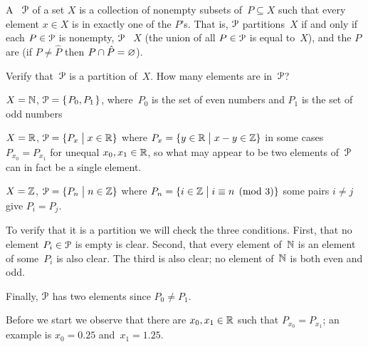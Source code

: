 \documentclass{ibl}  %
\begin{document}
\begin{df}
A ~$\EuScript{P}$ of a set $X$ is a 
collection of nonempty subsets of~$P\subseteq X$ such that every 
element $x\in X$ is in exactly one of the $P$'s.
That is, $\EuScript{P}$ partitions~$X$ if and only if each
$P\in\EuScript{P}$ is nonempty,
$\EuScript{P}$ ~$X$
(the union of all $P\in\EuScript{P}$ is equal to~$X$),
and the $P$ are 
(if $P\neq \hat{P}$ then $P\cap \hat{P}=\varnothing$).
\end{df}

\begin{center}
\end{center}

\begin{ex} Verify that~$\EuScript{P}$ is a partition of~$X$.  
  How many elements are in~$\EuScript{P}$?
\begin{exes}
\item $X=\mathbb{N}$, $\EuScript{P}=\mbox{$\{\hspace{0.1em}P_0,P_1\hspace{0.1em}\}$}$, 
  where~$P_0$ is the set of even numbers
  and $P_1$ is the set of odd numbers
\item $X=\mathbb{R}$, $\EuScript{P}=\{P_x \bigm| x\in \mathbb{R}\}$
      where $P_x=\{y\in\mathbb{R} \bigm| x-y\in \mathbb{Z}\}$
      \hspace{1em}\hint in some cases $P_{x_0}=P_{x_1}$ for unequal
      $x_0,x_1\in\mathbb{R}$,
      so what may appear to be two elements of~$\EuScript{P}$
      can in fact be a single element.
\item $X=\mathbb{Z}$, $\EuScript{P}=\{P_n \bigm| n\in\mathbb{Z}\}$
      where $P_n=\{i\in\mathbb{Z} \bigm| i\equiv n\pmod 3\}$\hspace{1em}%
      \hint some pairs $i\neq j$ give $P_i=P_j$. 
\end{exes}
\begin{ans}
\begin{exes}
\item To verify that it is a partition we will check the three conditions.
  First, that no element $P_i\in \EuScript{P}$ is empty is clear.
  Second, that every element of~$\mathbb{N}$ is an element of some~$P_i$ is
  also clear.
  The third is also clear; no element of~$\mathbb{N}$ is both even and odd.

  Finally, $\EuScript{P}$ has two elements since $P_0\neq P_1$.
\item Before we start we observe that there are $x_0,x_1\in\mathbb{R}$ such that
  $P_{x_0}=P_{x_1}$; an example is $x_0=0.25$ and~$x_1=1.25$.


\end{exes}
\end{ans}
\end{ex}
\end{document}
